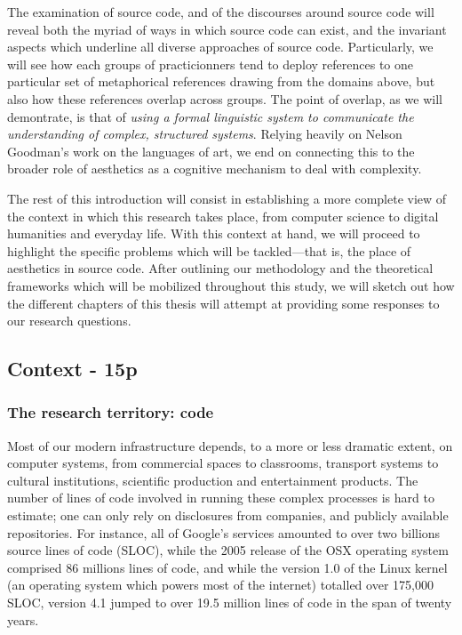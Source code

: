 The examination of source code, and of the discourses around source code will reveal both the myriad of ways in which source code can exist, and the invariant aspects which underline all diverse approaches of source code. Particularly, we will see how each groups of practicionners tend to deploy references to one particular set of metaphorical references drawing from the domains above, but also how these references overlap across groups. The point of overlap, as we will demontrate, is that of \emph{using a formal linguistic system to communicate the understanding of complex, structured systems}. Relying heavily on Nelson Goodman's work on the languages of art\cite{goodman_languages_1976}, we end on connecting this to the broader role of aesthetics as a cognitive mechanism to deal with complexity.

The rest of this introduction will consist in establishing a more complete view of the context in which this research takes place, from computer science to digital humanities and everyday life. With this context at hand, we will proceed to highlight the specific problems which will be tackled—that is, the place of aesthetics in source code. After outlining our methodology and the theoretical frameworks which will be mobilized throughout this study, we will sketch out how the different chapters of this thesis will attempt at providing some responses to our research questions.

\subsection{Context - 15p}

\subsubsection{The research territory: code}

Most of our modern infrastructure depends, to a more or less dramatic extent, on computer systems\cite{kitchin_codespace_2011}, from commercial spaces to classrooms, transport systems to cultural institutions, scientific production and entertainment products. The number of lines of code involved in running these complex processes is hard to estimate; one can only rely on disclosures from companies, and publicly available repositories. For instance, all of Google's services amounted to over two billions source lines of code (SLOC)\cite{scale_why_2015}, while the 2005 release of the OSX operating system comprised 86 millions lines of code, and while the version 1.0 of the Linux kernel (an operating system which powers most of the internet) totalled over 175,000 SLOC, version 4.1 jumped to over 19.5 million lines of code in the span of twenty years\cite{noauthor_linux_2021}.

